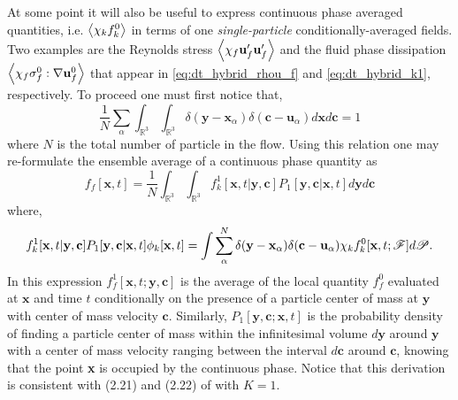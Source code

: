 At some point it will also be useful to express continuous phase averaged quantities, i.e. $\left<\chi_k f_k^0\right>$  in terms of one  \textit{single-particle} conditionally-averaged fields. 
Two examples are the Reynolds stress $\left<\chi_f \textbf{u}_f'\textbf{u}_f'\right>$ and the fluid phase dissipation $\left<\chi_f\sigma_f^0:\mathbf{\nabla} \textbf{u}_f^0\right>$ that appear in \ref{eq:dt_hybrid_rhou_f} and \ref{eq:dt_hybrid_k1}, respectively.  
To proceed one must first notice that, 
\begin{equation}
    \frac{1}{N}\sum_\alpha 
    \int_{\mathbb{R}^3}
    \int_{\mathbb{R}^3}
    \delta(\textbf{y}-\textbf{x}_\alpha)
    \delta(\textbf{c}-\textbf{u}_\alpha)
    d\textbf{x}
    d\textbf{c}
    = 1
\end{equation}
where $N$ is the total number of particle in the flow. 
Using this relation one may re-formulate the ensemble average of a continuous phase quantity as 
\begin{equation}
    f_f[\textbf{x},t]
    = 
    \frac{1}{N}
    \int_{\mathbb{R}^3}
    \int_{\mathbb{R}^3}
    f_k^1[\textbf{x},t|\textbf{y},\textbf{c}]  P_1[\textbf{y},\textbf{c}|\textbf{x},t] 
    d\textbf{y} 
    d\textbf{c}
    \label{eq:conditional_averaged_fluid}
\end{equation}
where,
\begin{equation*}
    f_k^1[\textbf{x},t|\textbf{y},\textbf{c}] P_1[\textbf{y},\textbf{c}|\textbf{x},t] \phi_k[\textbf{x},t]
    =     
    \int
    \sum_\alpha^N 
    \delta(\textbf{y}-\textbf{x}_\alpha)
     \delta(\textbf{c}-\textbf{u}_\alpha)
    \chi_k
    f^0_k[\textbf{x},t;\mathscr{F}]
    d\mathscr{P}.
\end{equation*}
In this expression $f_f^1[\textbf{x},t;\textbf{y},\textbf{c}]$ is the average of the local quantity $f_f^0$ evaluated at $\textbf{x}$ and time $t$ conditionally on the presence of a particle center of mass at $\textbf{y}$ with center of mass velocity $\textbf{c}$. 
Similarly, $P_1[\textbf{y},\textbf{c};\textbf{x},t]$ is the probability density of finding a particle center of mass within the infinitesimal volume $d\textbf{y}$ around $\textbf{y}$ with a center of mass velocity ranging between the interval $d\textbf{c}$ around $\textbf{c}$, knowing that the point \textbf{x} is occupied by the continuous phase. 
Notice that this derivation is consistent with (2.21) and (2.22) of \citet{zhang1994ensemble} with $K = 1$. 


